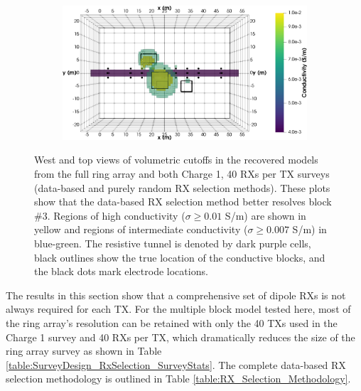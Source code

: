 \documentclass[preprint,authoryear,12pt]{elsarticle}
\begin{document}
\begin{figure}[htp]{}
\begin{center}
\begin{subfigure}{0.55\linewidth}
      \end{subfigure}
      \hspace{-4.0cm}
      \qquad
      \begin{subfigure}{0.55\linewidth}
         \label{fig:MultiBlk_StraightTunnel_RxSelection_Random_40RxPerTx_Top_2ISO}
         \includegraphics[trim=0cm 0cm 0cm 0cm, clip=true,width=\linewidth]{./figures/Fig25f.png}
      \end{subfigure}
      \vspace{0.2cm}

   \end{center}
\vspace{-0.4cm}
\caption{West and top views of volumetric cutoffs in the recovered models from the full ring array and both Charge 1, 40 RXs per TX surveys (data-based and purely random RX selection methods). These plots show that the data-based RX selection method better resolves block \#3. Regions of high conductivity ($\sigma \geq 0.01$ S/m) are shown in yellow and regions of intermediate conductivity ($\sigma \geq 0.007$ S/m) in blue-green. The resistive tunnel is denoted by dark purple cells, black outlines show the true location of the conductive blocks, and the black dots mark electrode locations.}
\label{fig:InvMod_SurveyDesign_MultiBlk_Isosurfaces_RxSelection_DataVsRandom}
\end{figure}


The results in this section show that a comprehensive set of dipole RXs is not always required for each TX. For the multiple block model tested here, most of the ring array's resolution can be retained with only the 40 TXs used in the Charge 1 survey and 40 RXs per TX, which dramatically reduces the size of the ring array survey as shown in Table \ref{table:SurveyDesign_RxSelection_SurveyStats}. The complete data-based RX selection methodology is outlined in Table \ref{table:RX_Selection_Methodology}.
\end{document}

